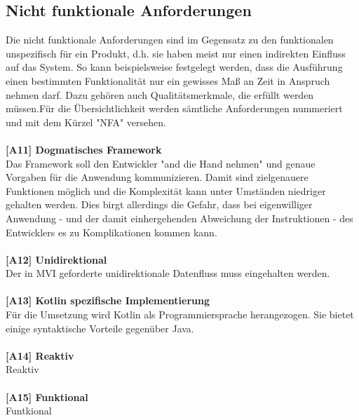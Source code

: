 \subsection{Nicht funktionale Anforderungen}
Die nicht funktionale Anforderungen sind im Gegensatz zu den funktionalen unspezifisch für ein Produkt, d.h. sie haben meist nur einen indirekten Einfluss auf das System. So kann beispielsweise festgelegt werden, dass die Ausführung einen bestimmten Funktionalität nur ein gewisses Maß an Zeit in Anspruch nehmen darf. Dazu gehören auch Qualitätsmerkmale, die erfüllt werden müssen.Für die Übersichtlichkeit werden sämtliche Anforderungen nummeriert und mit dem Kürzel "NFA" versehen.
\\
\\
\textbf{[A11] Dogmatisches Framework}
\\
Das Framework soll den Entwickler "and die Hand nehmen" und genaue Vorgaben für die Anwendung kommunizieren. Damit sind zielgenauere Funktionen möglich und die Komplexität kann unter Umständen niedriger gehalten werden. Dies birgt allerdings die Gefahr, dass bei eigenwilliger Anwendung - und der damit einhergehenden Abweichung der Instruktionen - des Entwicklers es zu Komplikationen kommen kann.
\\
\\
\textbf{[A12] Unidirektional}
\\
Der in MVI geforderte unidirektionale Datenfluss muss eingehalten werden.
\\
\\
\textbf{[A13] Kotlin spezifische Implementierung}
\\
Für die Umsetzung wird Kotlin als Programmiersprache herangezogen. Sie bietet einige syntaktische Vorteile gegenüber Java.
\\
\\
\textbf{[A14] Reaktiv}
\\
Reaktiv
\\
\\
\textbf{[A15] Funktional}
\\
Funtkional
\\
\\
